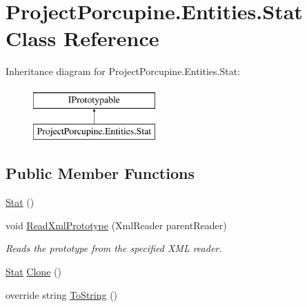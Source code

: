 \hypertarget{class_project_porcupine_1_1_entities_1_1_stat}{}\section{Project\+Porcupine.\+Entities.\+Stat Class Reference}
\label{class_project_porcupine_1_1_entities_1_1_stat}
Inheritance diagram for Project\+Porcupine.\+Entities.\+Stat\+:\begin{figure}[H]
\begin{center}
\leavevmode
\includegraphics[height=2.000000cm]{class_project_porcupine_1_1_entities_1_1_stat}
\end{center}
\end{figure}
\subsection*{Public Member Functions}
\begin{DoxyCompactItemize}
\item 
\hyperlink{class_project_porcupine_1_1_entities_1_1_stat_acbcdcdcce6742758fccbe935e9813bd2}{Stat} ()
\item 
void \hyperlink{class_project_porcupine_1_1_entities_1_1_stat_a420448593510dc5ef1931cc099dbf164}{Read\+Xml\+Prototype} (Xml\+Reader parent\+Reader)
\begin{DoxyCompactList}\small\item\em Reads the prototype from the specified X\+ML reader. \end{DoxyCompactList}\item 
\hyperlink{class_project_porcupine_1_1_entities_1_1_stat}{Stat} \hyperlink{class_project_porcupine_1_1_entities_1_1_stat_a4c3fcc624774080c6a5f5c2a2db213da}{Clone} ()
\item 
override string \hyperlink{class_project_porcupine_1_1_entities_1_1_stat_adec4f912fee945e0cd6a217ec21f9ab1}{To\+String} ()
\end{DoxyCompactItemize}
